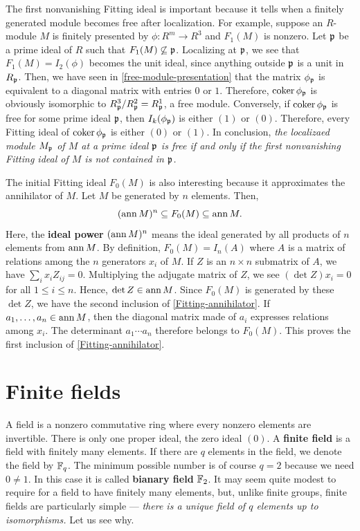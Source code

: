 The first nonvanishing Fitting ideal is important because it tells 
when a finitely generated module becomes free after localization.
For example, suppose an $R$-module $M$ is finitely presented by $\phi : R^m \to R^3$ and $F_1(M)$ is nonzero.
Let $\mathfrak{p}$ be a prime ideal of $R$ such that $F_1(M) \not\subseteq \mathfrak{p}$.
Localizing at $\mathfrak{p}$, we see that $F_1(M) = I_2(\phi)$ becomes the unit ideal,
since anything outside $\mathfrak{p}$ is a unit in $R_{\mathfrak{p}}$.
Then, we have seen in \eqref{free-module-presentation} that
the matrix $\phi_{\mathfrak{p}}$ is equivalent to a diagonal matrix with entries $0$ or $1$.
Therefore, $\mathop{\mathrm{coker}}\nolimits \phi_{\mathfrak{p}}$ is obviously isomorphic to $R_{\mathfrak{p}}^3/R_{\mathfrak{p}}^2 = R_{\mathfrak{p}}^1$, a free module.
Conversely, if $\mathop{\mathrm{coker}}\nolimits \phi_{\mathfrak{p}}$ is free for some prime ideal $\mathfrak{p}$,
then $I_k(\phi_{\mathfrak{p}})$ is either $(1)$ or $(0)$.
Therefore, every Fitting ideal of $\mathop{\mathrm{coker}}\nolimits \phi_{\mathfrak{p}}$ is either $(0)$ or $(1)$.
In conclusion, {\em the localizaed module $M_{\mathfrak{p}}$ of $M$ at a prime ideal $\mathfrak{p}$ is free 
if and only if the first nonvanishing Fitting ideal of $M$ is not contained in $\mathfrak{p}$.}


The initial Fitting ideal $F_0(M)$ is also interesting because it approximates the annihilator of $M$.
Let $M$ be generated by $n$ elements. Then,
\begin{equation}
(\mathop{\mathrm{ann}}\nolimits M)^n \subseteq F_0(M) \subseteq \mathop{\mathrm{ann}}\nolimits M .
\label{Fitting-annihilator}
\end{equation}
Here, the {\bf ideal power} $(\mathop{\mathrm{ann}}\nolimits M)^n$ means the ideal generated by all products of $n$ elements from $\mathop{\mathrm{ann}}\nolimits M$.
By definition, $F_0(M) = I_n(A)$ where $A$ is a matrix of relations among the $n$ generators $x_i$ of $M$.
If $Z$ is an $n \times n$ submatrix of $A$, we have $\sum_i  x_i Z_{ij} = 0$.
Multiplying the adjugate matrix of $Z$, we see $(\det Z) x_i = 0$ for all $1 \le i \le n$.
Hence, $\det Z \in \mathop{\mathrm{ann}}\nolimits M$. Since $F_0(M)$ is generated by these $\det Z$, we have the second inclusion
of \eqref{Fitting-annihilator}.
If $a_1,\ldots, a_n \in \mathop{\mathrm{ann}}\nolimits M$, then the diagonal matrix made of $a_i$ expresses relations among $x_i$.
The determinant $a_1\cdots a_n$ therefore belongs to $F_0(M)$.
This proves the first inclusion of \eqref{Fitting-annihilator}.




\section{Finite fields}

A field is a nonzero commutative ring where every nonzero elements are invertible.
There is only one proper ideal, the zero ideal $(0)$.
A {\bf finite field} is a field with finitely many elements.
If there are $q$ elements in the field, we denote the field by $\mathbb{F}_q$.
The minimum possible number is of course $q=2$ because we need $0 \neq 1$.
In this case it is called {\bf bianary field} $\mathbb{F}_2$.
It may seem quite modest to require for a field to have finitely many elements,
but, unlike finite groups, finite fields are particularly simple ---
{\em there is a unique field of $q$ elements up to isomorphisms.}
Let us see why.


